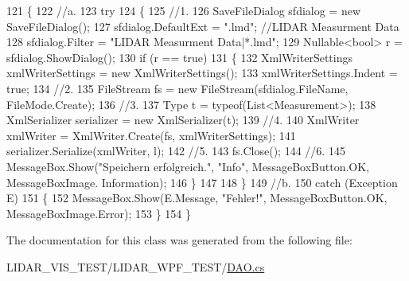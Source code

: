 \begin{DoxyCode}
121         \{
122             \textcolor{comment}{//a.}
123             \textcolor{keywordflow}{try}
124             \{
125                 \textcolor{comment}{//1.}
126                 SaveFileDialog sfdialog = \textcolor{keyword}{new} SaveFileDialog();
127                 sfdialog.DefaultExt = \textcolor{stringliteral}{".lmd"}; \textcolor{comment}{//LIDAR Measurment Data}
128                 sfdialog.Filter = \textcolor{stringliteral}{"LIDAR Measurment Data|*.lmd"};
129                 Nullable<bool> r = sfdialog.ShowDialog();
130                 \textcolor{keywordflow}{if} (r == \textcolor{keyword}{true})
131                 \{
132                     XmlWriterSettings xmlWriterSettings = \textcolor{keyword}{new} XmlWriterSettings();
133                     xmlWriterSettings.Indent = \textcolor{keyword}{true};
134                     \textcolor{comment}{//2.}
135                     FileStream fs = \textcolor{keyword}{new} FileStream(sfdialog.FileName, FileMode.Create);
136                     \textcolor{comment}{//3.}
137                     Type t = typeof(List<Measurement>);
138                     XmlSerializer serializer = \textcolor{keyword}{new} XmlSerializer(t);
139                     \textcolor{comment}{//4.}
140                     XmlWriter xmlWriter = XmlWriter.Create(fs, xmlWriterSettings);
141                     serializer.Serialize(xmlWriter, l);
142                     \textcolor{comment}{//5.}
143                     fs.Close();
144                     \textcolor{comment}{//6.}
145                     MessageBox.Show(\textcolor{stringliteral}{"Speichern erfolgreich."}, \textcolor{stringliteral}{"Info"}, MessageBoxButton.OK, MessageBoxImage.
      Information);
146                 \}
147                 
148             \}
149             \textcolor{comment}{//b.}
150             \textcolor{keywordflow}{catch} (Exception E)
151             \{
152                 MessageBox.Show(E.Message, \textcolor{stringliteral}{"Fehler!"}, MessageBoxButton.OK, MessageBoxImage.Error);
153             \}
154         \}
\end{DoxyCode}


The documentation for this class was generated from the following file\+:\begin{DoxyCompactItemize}
\item 
L\+I\+D\+A\+R\+\_\+\+V\+I\+S\+\_\+\+T\+E\+S\+T/\+L\+I\+D\+A\+R\+\_\+\+W\+P\+F\+\_\+\+T\+E\+S\+T/\hyperlink{_d_a_o_8cs}{D\+A\+O.\+cs}\end{DoxyCompactItemize}
